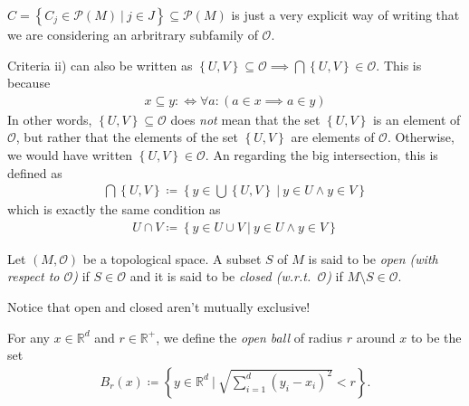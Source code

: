 \begin{notation}
    \(C = \left\{ C_j \in \mathcal{P} (M)\ \big|\  j \in J \right\} \subseteq \mathcal{P}(M)\) is just a very explicit way of writing that we are considering an arbritrary subfamily of \(\mathcal{O}\).
\end{notation}
\begin{notation}
    Criteria ii) can also be written as \(\left\{ U, V \right\} \subseteq \mathcal{O} \implies \bigcap \left\{ U, V \right\} \in \mathcal{O} \). This is because \begin{align*}
        x \subseteq y : \iff \forall a : (a \in x \implies a \in y)
    \end{align*}
    In other words, \(\left\{ U, V \right\} \subseteq \mathcal{O}\) does \textit{not} mean that the set \(\left\{ U, V \right\}\) is an element of \(\mathcal{O} \), but rather that the elements of the set \(\left\{ U, V \right\}\) are elements of \(\mathcal{O} \). Otherwise, we would have written \(\left\{ U, V \right\} \in \mathcal{O}\). An regarding the big intersection, this is defined as \begin{align*}
        \bigcap \left\{U, V\right\} \coloneqq  \left\{ y \in \bigcup \left\{U, V\right\}\ \big|\ y \in U \wedge y \in V \right\} 
    \end{align*}
    which is exactly the same condition as \begin{align*}
        U \cap V \coloneqq \left\{ y \in U \cup V\ \big|\ y \in U \wedge y \in V\right\} 
    \end{align*}
\end{notation}

\begin{definition}
    Let \((M, \mathcal{O} )\) be a topological space. A subset \(S\) of \(M\) is said to be \textit{open (with respect to \(\mathcal{O} \))} if \(S \in \mathcal{O}\) and it is said to be \textit{closed (w.r.t.\ \(\mathcal{O} \))} if \(M \setminus S \in \mathcal{O}\).
\end{definition}

Notice that open and closed aren't mutually exclusive!

\begin{definition}
    For any \(x \in \mathbb{R}^d\) and \(r \in \mathbb{R}^+\), we define the \textit{open ball} of radius \(r\) around \(x\) to be the set \begin{align*}
        B_r (x) \coloneqq \left\{ y \in \mathbb{R} ^d\ \big|\ \sqrt{\sum_{i = 1}^d \left( y_i - x_i \right)^{2}  } < r \right\}.
    \end{align*}
\end{definition}

